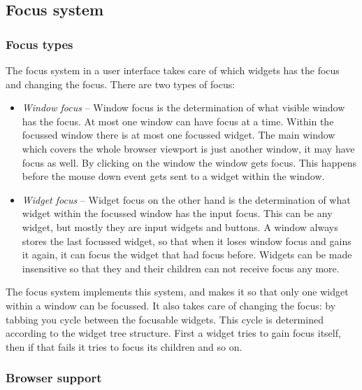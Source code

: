 \documentclass[11pt,a4paper]{article}
\begin{document}
\subsection{Focus system}

\subsubsection{Focus types}
The focus system in a user interface takes care of which widgets has the focus and changing the focus.
There are two types of focus:

\begin{itemize}
\item \textit{Window focus} -- Window focus is the determination of what visible window has the focus.
At most one window can have focus at a time.
Within the focussed window there is at most one focussed widget.
The main window which covers the whole browser viewport is just another window, it may have focus as well.
By clicking on the window the window gets focus.
This happens before the mouse down event gets sent to a widget within the window.

\item \textit{Widget focus} -- Widget focus on the other hand is the determination of what widget within the focussed window has the input focus.
This can be any widget, but mostly they are input widgets and buttons.
A window always stores the last focussed widget, so that when it loses window focus and gains it again, it can focus the widget that had focus before.
Widgets can be made insensitive so that they and their children can not receive focus any more.

\end{itemize}

The focus system implements this system, and makes it so that only one widget within a window can be focussed.
It also takes care of changing the focus: by tabbing you cycle between the focusable widgets.
This cycle is determined according to the widget tree structure.
First a widget tries to gain focus itself, then if that fails it tries to focus its children and so on. 

\subsubsection{Browser support}
\end{document}
